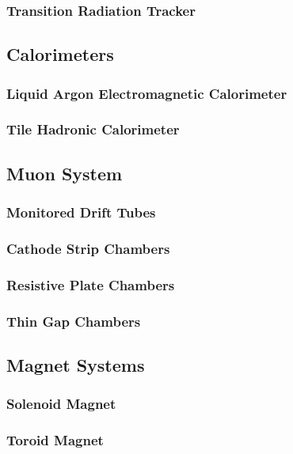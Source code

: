 		\subsubsection{Transition Radiation Tracker}

	\subsection{Calorimeters}

		\subsubsection{Liquid Argon Electromagnetic Calorimeter}

		\subsubsection{Tile Hadronic Calorimeter}

	\subsection{Muon System}

		\subsubsection{Monitored Drift Tubes}

		\subsubsection{Cathode Strip Chambers}

		\subsubsection{Resistive Plate Chambers} 

		\subsubsection{Thin Gap Chambers}

	\subsection{Magnet Systems}

		\subsubsection{Solenoid Magnet}

		\subsubsection{Toroid Magnet}

		
